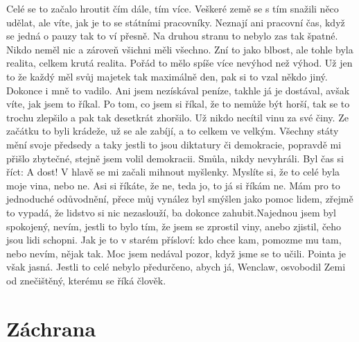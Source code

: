 Celé se to začalo hroutit čím dále, tím více. Veškeré země se s tím snažili něco udělat, ale víte, jak je to se státními pracovníky. Neznají ani pracovní čas, když se jedná o pauzy tak to ví přesně. Na druhou stranu to nebylo zas tak špatné. Nikdo neměl nic a zároveň všichni měli všechno. Zní to jako blbost, ale tohle byla realita, celkem krutá realita. Pořád to mělo spíše více nevýhod než výhod. Už jen to že každý měl svůj majetek tak maximálně den, pak si to vzal někdo jiný. Dokonce i mně to vadilo. Ani jsem nezískával peníze, takhle já je dostával, avšak víte, jak jsem to říkal. Po tom, co jsem si říkal, že to nemůže být horší, tak se to trochu zlepšilo a pak tak desetkrát zhoršilo. Už nikdo necítil vinu za své činy. Ze začátku to byli krádeže, už se ale zabíjí, a to celkem ve velkým. Všechny státy mění svoje předsedy a taky jestli to jsou diktatury či demokracie, popravdě mi přišlo zbytečné, stejně jsem volil demokracii. Smůla, nikdy nevyhráli. Byl čas si říct: A dost! V hlavě se mi začali mihnout myšlenky. Myslíte si, že to celé byla moje vina, nebo ne. Asi si říkáte, že ne, teda jo, to já si říkám ne. Mám pro to jednoduché odůvodnění, přece můj vynález byl smýšlen jako pomoc lidem, zřejmě to vypadá, že lidstvo si nic nezaslouží, ba dokonce zahubit.Najednou jsem byl spokojený, nevím, jestli to bylo tím, že jsem se zprostil viny, anebo zjistil, čeho jsou lidi schopni. Jak je to v starém přísloví: kdo chce kam, pomozme mu tam, nebo nevím, nějak tak. Moc jsem nedával pozor, když jsme se to učili. Pointa je však jasná. Jestli to celé nebylo předurčeno, abych já, Wenclaw, osvobodil Zemi od znečištěný, kterému se říká člověk.

\section{Záchrana}

